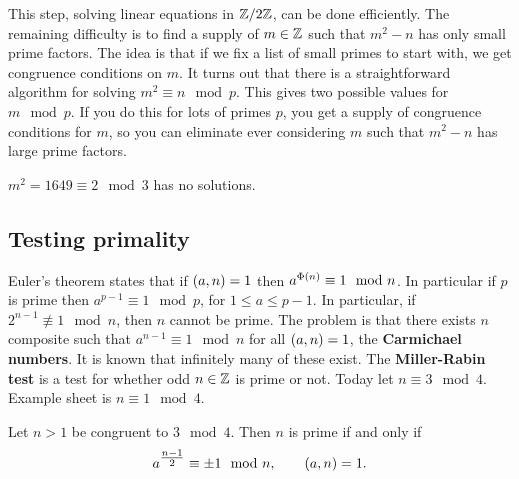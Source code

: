 This step, solving linear equations in $ \mathbb{Z} / 2\mathbb{Z} $, can be done efficiently. The remaining difficulty is to find a supply of $ m \in \mathbb{Z} $ such that $ m^2 - n $ has only small prime factors. The idea is that if we fix a list of small primes to start with, we get congruence conditions on $ m $. It turns out that there is a straightforward algorithm for solving $ m^2 \equiv n \mod p $. This gives two possible values for $ m \mod p $. If you do this for lots of primes $ p $, you get a supply of congruence conditions for $ m $, so you can eliminate ever considering $ m $ such that $ m^2 - n $ has large prime factors.

\begin{example*}
$ m^2 = 1649 \equiv 2 \mod 3 $ has no solutions.
\end{example*}


\subsection{Testing primality}

Euler's theorem states that if $ \br{a, n} = 1 $ then $ a^{\Phi\br{n}} \equiv 1 \mod n $. In particular if $ p $ is prime then $ a^{p - 1} \equiv 1 \mod p $, for $ 1 \le a \le p - 1 $. In particular, if $ 2^{n - 1} \not\equiv 1 \mod n $, then $ n $ cannot be prime. The problem is that there exists $ n $ composite such that $ a^{n - 1} \equiv 1 \mod n $ for all $ \br{a, n} = 1 $, the \textbf{Carmichael numbers}. It is known that infinitely many of these exist. The \textbf{Miller-Rabin test} is a test for whether odd $ n \in \mathbb{Z} $ is prime or not. Today let $ n \equiv 3 \mod 4 $. Example sheet is $ n \equiv 1 \mod 4 $.

\begin{lemma}
\label{lem:30}
Let $ n > 1 $ be congruent to $ 3 \mod 4 $. Then $ n $ is prime if and only if
$$ a^{\tfrac{n - 1}{2}} \equiv \pm 1 \mod n, \qquad \br{a, n} = 1. $$
\end{lemma}

\pagebreak

